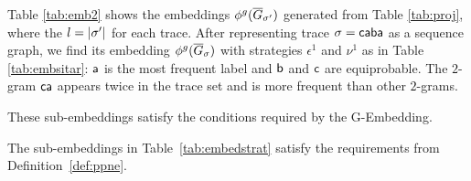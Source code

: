 \begin{example}
	Table \ref{tab:emb2} shows the embeddings ${\phi^{g}}(\overline{G}_{\sigma'})$ generated from Table \ref{tab:proj}, where the $l=|{\sigma'}|$ for each \unravelled trace.
	After representing trace $\sigma=\mathsf{caba}$ as a sequence graph, we find its
	embedding ${\phi^{g}}(\overline{G}_{\sigma})$ with strategies $\epsilon^1$ and $\nu^1$
	{as} in Table \ref{tab:embsitar}: $\mathsf{a}$ is the most frequent label and $\mathsf{b}$ and $\mathsf{c}$ are equiprobable.
	The $2$-gram $\mathsf{ca}$ appears twice in the trace set and is more frequent than other $2$-grams.
\end{example}
%
These sub-embeddings satisfy the conditions required by the G-Embedding.
\begin{lemma}
	\label{lem:addedForOurPropos}
	The sub-embeddings in Table~\ref{tab:embedstrat} satisfy the requirements from Definition~\ref{def:ppne}.
\end{lemma}


